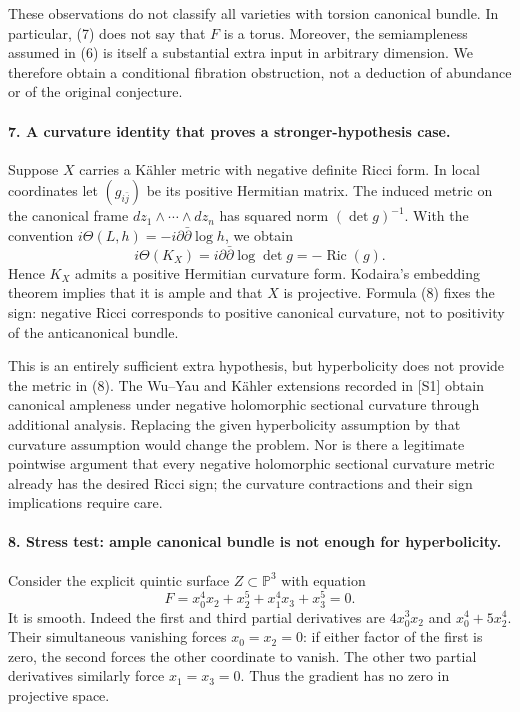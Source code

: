 \documentclass[11pt]{article}
\begin{document}
These observations do not classify all varieties with torsion canonical bundle. In particular, (7) does not say that $F$ is a torus. Moreover, the semiampleness assumed in (6) is itself a substantial extra input in arbitrary dimension. We therefore obtain a conditional fibration obstruction, not a deduction of abundance or of the original conjecture.

\paragraph{7. A curvature identity that proves a stronger-hypothesis case.}
Suppose $X$ carries a K\"ahler metric with negative definite Ricci form. In local coordinates let $(g_{i\bar j})$ be its positive Hermitian matrix. The induced metric on the canonical frame $dz_1\wedge\cdots\wedge dz_n$ has squared norm $(\det g)^{-1}$. With the convention $i\Theta(L,h)=-i\partial\bar\partial\log h$, we obtain
\[
 i\Theta(K_X)=i\partial\bar\partial\log\det g
             =-\operatorname{Ric}(g).                 \tag{8}
\]
Hence $K_X$ admits a positive Hermitian curvature form. Kodaira's embedding theorem implies that it is ample and that $X$ is projective. Formula (8) fixes the sign: negative Ricci corresponds to positive canonical curvature, not to positivity of the anticanonical bundle.

This is an entirely sufficient extra hypothesis, but hyperbolicity does not provide the metric in (8). The Wu--Yau and K\"ahler extensions recorded in [S1] obtain canonical ampleness under negative holomorphic sectional curvature through additional analysis. Replacing the given hyperbolicity assumption by that curvature assumption would change the problem. Nor is there a legitimate pointwise argument that every negative holomorphic sectional curvature metric already has the desired Ricci sign; the curvature contractions and their sign implications require care.

\paragraph{8. Stress test: ample canonical bundle is not enough for hyperbolicity.}
Consider the explicit quintic surface $Z\subset\mathbb P^3$ with equation
\[
 F=x_0^4x_2+x_2^5+x_1^4x_3+x_3^5=0.                   \tag{9}
\]
It is smooth. Indeed the first and third partial derivatives are $4x_0^3x_2$ and $x_0^4+5x_2^4$. Their simultaneous vanishing forces $x_0=x_2=0$: if either factor of the first is zero, the second forces the other coordinate to vanish. The other two partial derivatives similarly force $x_1=x_3=0$. Thus the gradient has no zero in projective space.
\end{document}
